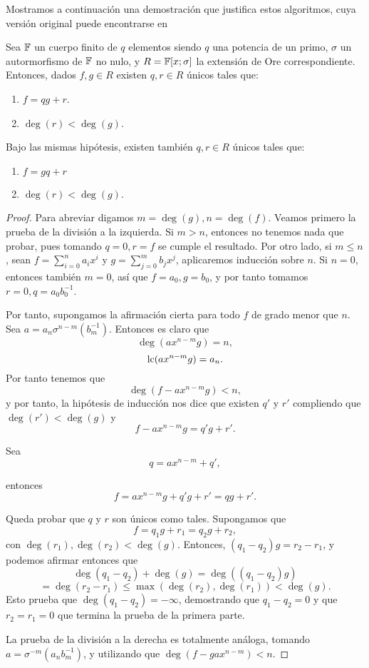 Mostramos a continuación una demostración que justifica estos algoritmos, cuya versión original puede encontrarse en~\cite[Th. 4.34]{bueso2003algorithmic}

\begin{theorem}
Sea \(\mathbb{F}\) un cuerpo finito de \(q\) elementos siendo \(q\) una potencia de un primo,  \(\sigma\) un autormorfismo de \(\mathbb{F}\) no nulo, y \(R = \mathbb{F}[x;\sigma]\) la extensión de Ore correspondiente. Entonces, dados \(f, g \in R\) existen \(q, r \in R\) únicos tales que:
\begin{enumerate}
    \item \(f = qg + r\).
    \item \(\deg(r) < \deg(g)\).
\end{enumerate}

Bajo las mismas hipótesis, existen también \(q, r \in R\) únicos tales que:
\begin{enumerate}
    \item \(f = gq + r\)
    \item \(\deg(r) < \deg(g)\).
\end{enumerate}
\end{theorem}

\begin{proof}
Para abreviar digamos \(m = \deg(g), n = \deg(f)\). Veamos primero la prueba de la división a la izquierda. Si \(m > n\), entonces no tenemos nada que probar, pues tomando  \(q = 0, r = f\) se cumple el resultado. Por otro lado, si \(m \leq n\), sean \(f = \sum_{i=0}^{n} a_i x^i\) y \(g = \sum_{j=0}^{m} b_j x^j\), aplicaremos inducción sobre \(n\). Si \(n = 0\), entonces también \(m = 0\), así que  \(f = a_0, g = b_0\), y por tanto tomamos \(r = 0, q = a_0 b_0^{-1}\).

Por tanto, supongamos la afirmación cierta para todo \(f\) de grado menor que \(n\).  Sea \(a = a_n \sigma^{n-m}(b_m^{-1})\). Entonces es claro que
\[
\deg(ax^{n-m}g) = n,
\]
\[
\operatorname{lc}(ax^{n-m}g) = a_n
.\]
Por tanto tenemos que
\[
\deg(f - a x^{n-m}g) < n,
\]
y por tanto, la hipótesis de inducción nos dice que existen \(q'\) y \(r'\) compliendo que \(\deg(r') < \deg(g)\)  y
\[
f - a x^{n-m}g = q'g + r'
.\]

Sea
\[
q = a x^{n-m} + q'
,\]

entonces
\[
f = a x^{n-m}g + q'g + r' = qg + r'
.\]

Queda probar que \(q\) y \(r\) son únicos como tales. Supongamos que
\[
f = q_1g + r_1 = q_2g + r_2,
\]
con \(\deg(r_1), \deg(r_2) < \deg(g)\). Entonces, \((q_1 - q_2)g = r_2 - r_1\), y podemos afirmar entonces que
\[
\deg(q_1 - q_2) + \deg(g) = \deg((q_1-q_2)g)
\]
\[
= \deg(r_2-r_1) \leq \max(\deg(r_2), \deg(r_1)) < \deg(g)
.\]
Esto prueba que \(\deg(q_1-q_2) = -\infty\), demostrando que \(q_1 - q_2 = 0\) y que \(r_2 = r_1 = 0\) que termina la prueba de la primera parte.

La prueba de la división a la derecha es totalmente análoga, tomando \(a = \sigma^{-m}(a_{n}b_{m}^{-1})\), y utilizando que \(\deg(f - gax^{n-m}) < n\).

\end{proof}

